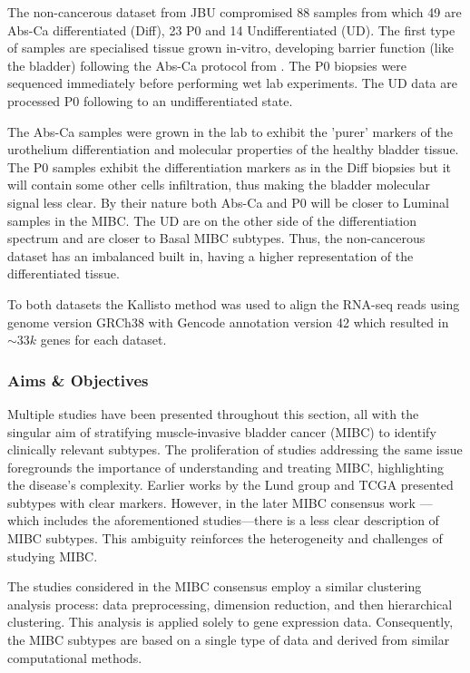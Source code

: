 The non-cancerous dataset from JBU compromised 88 samples from which 49 are Abs-Ca differentiated (Diff), 23 P0 and 14 Undifferentiated (UD). The first type of samples are specialised tissue grown in-vitro, developing barrier function (like the bladder) following the Abs-Ca protocol from \cite{Cross2005-fe}. The P0 biopsies were sequenced immediately before performing wet lab experiments. The UD data are processed P0 following \cite{Cross2005-fe} to an undifferentiated state. 

The Abs-Ca samples were grown in the lab to exhibit the 'purer' markers of the urothelium differentiation and molecular properties of the healthy bladder tissue. The P0 samples exhibit the differentiation markers as in the Diff biopsies but it will contain some other cells infiltration, thus making the bladder molecular signal less clear. By their nature both Abs-Ca and P0 will be closer to Luminal samples in the MIBC. The UD are on the other side of the differentiation spectrum and are closer to Basal MIBC subtypes. Thus, the non-cancerous dataset has an imbalanced built in, having a higher representation of the differentiated tissue. 

To both datasets the Kallisto method was used to align the RNA-seq reads using genome version GRCh38 with Gencode annotation version 42 which resulted in $\sim33k$ genes for each dataset.


\subsubsection{Aims \& Objectives} \label{s:lit:aims_objs}

Multiple studies have been presented throughout this section, all with the singular aim of stratifying muscle-invasive bladder cancer (MIBC) to identify clinically relevant subtypes. The proliferation of studies addressing the same issue foregrounds the importance of understanding and treating MIBC, highlighting the disease's complexity. Earlier works by the Lund group \cite{Sjodahl2017-xr, Marzouka2018-ge} and TCGA \cite{Tcga2014-dr, Robertson2017-mg} presented subtypes with clear markers. However, in the later MIBC consensus work \cite{Kamoun2020-tj}—which includes the aforementioned studies—there is a less clear description of MIBC subtypes. This ambiguity reinforces the heterogeneity and challenges of studying MIBC.

The studies considered in the MIBC consensus employ a similar clustering analysis process: data preprocessing, dimension reduction, and then hierarchical clustering. This analysis is applied solely to gene expression data. Consequently, the MIBC subtypes are based on a single type of data and derived from similar computational methods.

